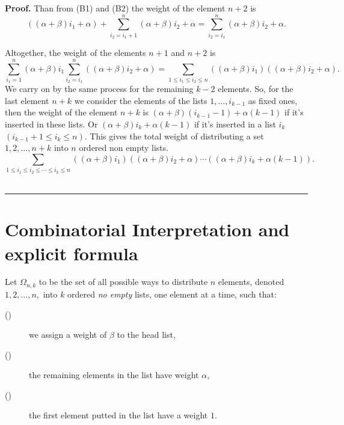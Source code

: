 \documentclass{article}
\newenvironment{proof}[1][Proof]{\noindent\textbf{#1.} }{\ \rule{0.5em}{0.5em}}
\begin{document}
\begin{proof}
Than from (B1) and (B2) the weight of the element $n+2$ is
  \begin{equation*}
  \left( \left( \alpha +\beta \right) i_{1}+\alpha \right) +\sum_{i_{2}=i_{1}+1}^{n}\left( \alpha +\beta \right)i_{2}+\alpha= \sum_{i_{2}=i_{1}}^{n}\left( \alpha +\beta \right)i_{2}+\alpha.
  \end{equation*}


Altogether, the weight of the elements $n+1$ and $n+2$ is
\begin{equation*}
\sum_{i_{1}=1}^{n}\left(  \alpha +\beta \right) i_{1}\sum_{i_{2}=i_{1}}^{n}\left( \left( \alpha +\beta \right) i_{2}+\alpha
\right) =\sum_{1\leq i_{1}\leq i_{2}\leq n}\left( \left( \alpha
+\beta \right) i_{1}\right) \left( \left( \alpha +\beta \right) i_{2}+\alpha
\right).
\end{equation*}
We carry on by the same process for the remaining $k-2$ elements. So, for
the last element $n+k$ we consider the elements of the lists $1,\ldots
,i_{k-1}$ as fixed ones, then the weight of the element $n+k$ is  $\left( \alpha +\beta \right)
(i_{k-1}-1)+\alpha (k-1)$ if it's inserted in these lists. Or $\left( \alpha +\beta \right) i_{k}+\alpha (k-1)$
if it's inserted in a list $i_{k}$ $\left( i_{k-1}+1\leq i_{k}\leq n\right) $. This gives the total weight of distributing a set $1,2,\ldots,n+k$ into $n$ ordered non empty lists.
\begin{equation*}
\sum_{1\leq i_{1}\leq i_{2}\leq \cdots \leq i_{k}\leq n}\left( \left( \alpha
+\beta \right) i_{1}\right) \left( \left( \alpha +\beta \right) i_{2}+\alpha
\right) \cdots \left( \left( \alpha +\beta \right) i_{k}+\alpha \left(
k-1\right) \right).
\end{equation*}
\end{proof}

\section{Combinatorial Interpretation and explicit formula}
Let $\Omega _{n,k}$ to be the set of all possible ways to distribute $n$
elements, denoted $1,2,\ldots ,n$,\ into $k$ ordered \textit{no empty}
lists, one element at a time, such that:

\begin{description}
  \item[({})]  we assign a weight of $\beta $ to the head list,
  \item[({})]  the remaining elements in the list have weight $\alpha$,
  \item[({})]  the first element putted in the list have a weight $1$.
\end{description}
\end{document}
